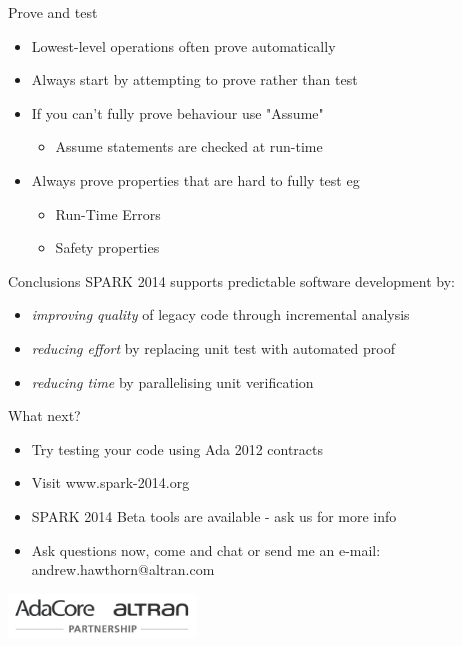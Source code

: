 \documentclass{beamer}
\begin{document}
\begin{frame}[fragile]{Prove and test}
  \begin{itemize}
     \item Lowest-level operations often prove automatically
     \item Always start by attempting to prove rather than test
     \item If you can't fully prove behaviour use "Assume"
     \begin{itemize}
        \item Assume statements are checked at run-time
     \end{itemize}
     \item Always prove properties that are hard to fully test eg
     \begin{itemize}
        \item Run-Time Errors 
        \item Safety properties
     \end{itemize}
     
  \end{itemize}
\end{frame}



\begin{frame}[fragile]{Conclusions}
  SPARK 2014 supports predictable software development by:
  \begin{itemize}
     \item \emph{improving quality} of legacy code through incremental analysis
     \item \emph{reducing effort} by replacing unit test with automated proof
     \item \emph{reducing time} by parallelising unit verification
  \end{itemize}

  \vspace{0.3cm}

  What next?
  \begin{itemize}
     \item Try testing your code using Ada 2012 contracts
     \item Visit www.spark-2014.org
     \item SPARK 2014 Beta tools are available - ask us for more info
     \item Ask questions now, come and chat or send me an e-mail: andrew.hawthorn@altran.com
  \end{itemize}

  \vspace{0.3cm}

  \begin{center}
     \includegraphics[width=5cm]{partnership_logo_big.png}
  \end{center}
\end{frame}
\end{document}
